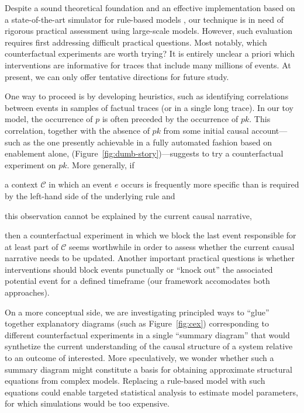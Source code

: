 Despite a sound theoretical foundation and an effective implementation
based on a state-of-the-art simulator for rule-based models
\cite{DanosEtAl-APLAS07,BoutillierEK17}, our technique is in need of
rigorous practical assessment using large-scale models. However, such
evaluation requires first addressing difficult practical
questions. Most notably, which counterfactual experiments are worth
trying? It is entirely unclear a priori which interventions are
informative for traces that include many millions of events. At
present, we can only offer tentative directions for future study.

One way to proceed is by developing heuristics, such as identifying
correlations between events in samples of factual traces (or in a
single long trace). In our toy model, the occurrence of $p$ is often
preceded by the occurrence of $pk$. This correlation, together with
the absence of $pk$ from some initial causal account---such as the one
presently achievable in a fully automated fashion based on enablement
alone, (Figure~\ref{fig:dumb-story})---suggests to try a
counterfactual experiment on $pk$. More generally, if
\begin{inparaenum}[(i)]
\item a context $\mathcal C$ in which an event $e$ occurs is
  frequently more specific than is required by the left-hand side of
  the underlying rule and
\item this observation cannot be explained by the current causal
  narrative,
\end{inparaenum} then a counterfactual experiment in which we block
the last event responsible for at least part of $\mathcal C$ seems
worthwhile in order to assess whether the current causal narrative
needs to be updated.  Another important practical questions is whether
interventions should block events punctually or ``knock out'' the
associated potential event for a defined timeframe (our framework
accomodates both approaches). 

On a more conceptual side, we are investigating principled ways to
``glue'' together explanatory diagrams (such as Figure~\ref{fig:cex})
corresponding to different counterfactual experiments in a single
``summary diagram'' that would synthetize the current understanding of
the causal structure of a system relative to an outcome of
interested. More speculatively, we wonder whether such a summary
diagram might constitute a basis for obtaining approximate structural
equations from complex models. Replacing a rule-based model with such
equations could enable targeted statistical analysis to estimate model
parameters, for which simulations would be too expensive.

